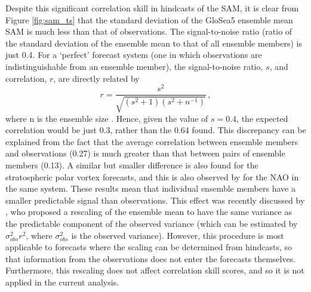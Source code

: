 Despite this significant correlation skill in hindcasts of the SAM, it is clear
from Figure \ref{fig:sam_ts} that the standard deviation of the GloSea5 ensemble
mean SAM is much less than that of observations. The signal-to-noise ratio
(ratio of the standard deviation of the ensemble mean to that of all ensemble
members) is just 0.4. For a `perfect' forecast system (one in which observations
are indistinguishable from an ensemble member), the signal-to-noise ratio, $s$,
and correlation, $r$, are directly related by 
\begin{equation}
r = \frac{s^2}{\sqrt{(s^2+1)(s^2+n^{-1})}} \, , 
\end{equation}
where n is the ensemble size \citep{Sardeshmukh2000,Kumar2009}. Hence, given the
value of $s=0.4$, the expected correlation would be just 0.3, rather than the
0.64 found. This discrepancy can be explained from the fact that the average
correlation between ensemble members and observations (0.27) is much greater
than that between pairs of ensemble members (0.13). A similar but smaller
difference is also found for the stratospheric polar vortex forecasts, and this
is also observed by \citet{Scaife2013} for the NAO in the same system. These
results mean that individual ensemble members have a smaller predictable signal
than observations. This effect was recently discussed by \citet{Eade2014}, who
proposed a rescaling of the ensemble mean to have the same variance as the
predictable component of the observed variance (which can be estimated by
$\sigma^2_{obs}r^2$, where $\sigma^2_{obs}$ is the observed variance). However,
this procedure is most applicable to forecasts where the scaling can be
determined from hindcasts, so that information from the observations does not
enter the forecasts themselves. Furthermore, this rescaling does not affect
correlation skill scores, and so it is not applied in the current analysis.

